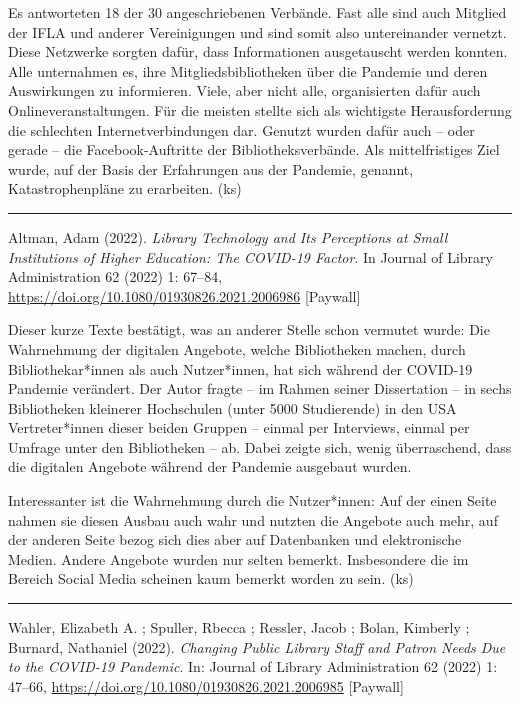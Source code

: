 \documentclass[a4paper,
fontsize=11pt,
oneside,
numbers=noperiodatend,
parskip=half-,
bibliography=totoc,
final
]{scrartcl}
\begin{document}
Es antworteten 18 der 30 angeschriebenen Verbände. Fast alle sind auch
Mitglied der IFLA und anderer Vereinigungen und sind somit also
untereinander vernetzt. Diese Netzwerke sorgten dafür, dass
Informationen ausgetauscht werden konnten. Alle unternahmen es, ihre
Mitgliedsbibliotheken über die Pandemie und deren Auswirkungen zu
informieren. Viele, aber nicht alle, organisierten dafür auch
Onlineveranstaltungen. Für die meisten stellte sich als wichtigste
Herausforderung die schlechten Internetverbindungen dar. Genutzt wurden
dafür auch -- oder gerade -- die Facebook-Auftritte der
Bibliotheksverbände. Als mittelfristiges Ziel wurde, auf der Basis der
Erfahrungen aus der Pandemie, genannt, Katastrophenpläne zu erarbeiten.
(ks)

\begin{center}\rule{0.5\linewidth}{0.5pt}\end{center}

Altman, Adam (2022). \emph{Library Technology and Its Perceptions at
Small Institutions of Higher Education: The COVID-19 Factor}. In Journal
of Library Administration 62 (2022) 1: 67--84,
\url{https://doi.org/10.1080/01930826.2021.2006986} {[}Paywall{]}

Dieser kurze Texte bestätigt, was an anderer Stelle schon vermutet
wurde: Die Wahrnehmung der digitalen Angebote, welche Bibliotheken
machen, durch Bibliothekar*innen als auch Nutzer*innen, hat sich während
der COVID-19 Pandemie verändert. Der Autor fragte -- im Rahmen seiner
Dissertation -- in sechs Bibliotheken kleinerer Hochschulen (unter 5000
Studierende) in den USA Vertreter*innen dieser beiden Gruppen -- einmal
per Interviews, einmal per Umfrage unter den Bibliotheken -- ab. Dabei
zeigte sich, wenig überraschend, dass die digitalen Angebote während der
Pandemie ausgebaut wurden.

Interessanter ist die Wahrnehmung durch die Nutzer*innen: Auf der einen
Seite nahmen sie diesen Ausbau auch wahr und nutzten die Angebote auch
mehr, auf der anderen Seite bezog sich dies aber auf Datenbanken und
elektronische Medien. Andere Angebote wurden nur selten bemerkt.
Insbesondere die im Bereich Social Media scheinen kaum bemerkt worden zu
sein. (ks)

\begin{center}\rule{0.5\linewidth}{0.5pt}\end{center}

Wahler, Elizabeth A. ; Spuller, Rbecca ; Ressler, Jacob ; Bolan,
Kimberly ; Burnard, Nathaniel (2022). \emph{Changing Public Library
Staff and Patron Needs Due to the COVID-19 Pandemic}. In: Journal of
Library Administration 62 (2022) 1: 47--66,
\url{https://doi.org/10.1080/01930826.2021.2006985} {[}Paywall{]}
\end{document}
